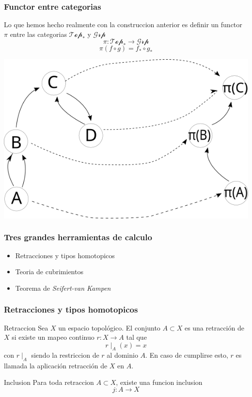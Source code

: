 \documentclass[xetex,mathserif,serif]{beamer}
\newcommand{\vank}{\emph{Seifert-van Kampen} }
\begin{document}
  \begin{frame}
    \frametitle{Functor entre categorias}
    Lo que hemos hecho realmente con la construccion anterior es definir
    un functor \(\pi\) entre las categorias \(\mathscr{Top}_*\) y
    \(\mathscr{Grp}\)
    \[ \pi : \mathscr{Top}_* \to \mathscr{Grp} \]
    \[ \pi (f \circ g) = f_* \circ g_* \]
    \begin{center}
      \includegraphics[scale=0.4]{./imag/categoria.png}
    \end{center}
  \end{frame}
  \begin{frame}
    \frametitle{Tres grandes herramientas de calculo}
    \begin{itemize}
    \item Retracciones y tipos homotopicos
    \item Teoria de cubrimientos
    \item Teorema de \vank
    \end{itemize}
  \end{frame}

  \begin{frame}
    \frametitle{Retracciones y tipos homotopicos}
    \begin{block}{Retraccion}
      Sea \(X\) un espacio topológico. El conjunto \(A \subset X\) es una
      retracción de \(X\) si existe un mapeo continuo \(r : X \to A\) tal que
      \[ r \mid_{A} (x) = x \]
      con \(r \mid_{A}\) siendo la restriccion de \(r\) al dominio \(A\). En
      caso de cumplirse esto, \(r\) es llamada la aplicación retracción de
      \(X\) en \(A\).
    \end{block}

    \begin{block}{Inclusion}
      Para toda retraccion \(A \subset X\), existe una funcion inclusion
      \[ j : A \to X \]
    \end{block}
  \end{frame}
\end{document}
